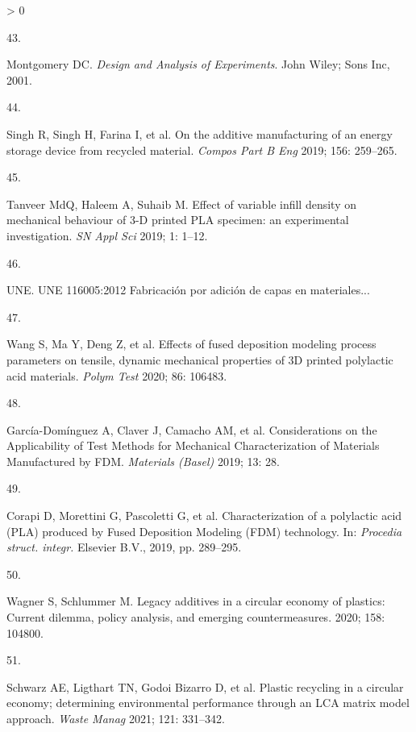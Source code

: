 \documentclass[
  12pt]{article}
\newlength{\cslhangindent}
\newlength{\csllabelwidth}
\newenvironment{CSLReferences}[2] %
 {%
  \setlength{\parindent}{0pt}
  \ifodd #1 \everypar{\setlength{\hangindent}{\cslhangindent}}\ignorespaces\fi
  \ifnum #2 > 0
  \setlength{\parskip}{#2\baselineskip}
  \fi
 }%
 {}
\newcommand{\CSLLeftMargin}[1]{\parbox[t]{\csllabelwidth}{#1}}
\newcommand{\CSLRightInline}[1]{\parbox[t]{\linewidth - \csllabelwidth}{#1}\break}
\begin{document}
\begin{CSLReferences}{0}{0}
\leavevmode\hypertarget{ref-Montgomery2001}{}%
\CSLLeftMargin{43. }
\CSLRightInline{Montgomery DC. \emph{{Design and Analysis of Experiments}}. John Wiley; Sons Inc, 2001.}

\leavevmode\hypertarget{ref-Singh2019}{}%
\CSLLeftMargin{44. }
\CSLRightInline{Singh R, Singh H, Farina I, et al. {On the additive manufacturing of an energy storage device from recycled material}. \emph{Compos Part B Eng} 2019; 156: 259--265.}

\leavevmode\hypertarget{ref-Tanveer2019}{}%
\CSLLeftMargin{45. }
\CSLRightInline{Tanveer MdQ, Haleem A, Suhaib M. {Effect of variable infill density on mechanical behaviour of 3-D printed PLA specimen: an experimental investigation}. \emph{SN Appl Sci} 2019; 1: 1--12.}

\leavevmode\hypertarget{ref-UNE}{}%
\CSLLeftMargin{46. }
\CSLRightInline{UNE. {UNE 116005:2012 Fabricaci{ó}n por adici{ó}n de capas en materiales...}}

\leavevmode\hypertarget{ref-Wang2020h}{}%
\CSLLeftMargin{47. }
\CSLRightInline{Wang S, Ma Y, Deng Z, et al. {Effects of fused deposition modeling process parameters on tensile, dynamic mechanical properties of 3D printed polylactic acid materials}. \emph{Polym Test} 2020; 86: 106483.}

\leavevmode\hypertarget{ref-Garcia-Dominguez2020}{}%
\CSLLeftMargin{48. }
\CSLRightInline{García-Domínguez A, Claver J, Camacho AM, et al. {Considerations on the Applicability of Test Methods for Mechanical Characterization of Materials Manufactured by FDM}. \emph{Materials (Basel)} 2019; 13: 28.}

\leavevmode\hypertarget{ref-Corapi2019}{}%
\CSLLeftMargin{49. }
\CSLRightInline{Corapi D, Morettini G, Pascoletti G, et al. {Characterization of a polylactic acid (PLA) produced by Fused Deposition Modeling (FDM) technology}. In: \emph{Procedia struct. integr.} Elsevier B.V., 2019, pp. 289--295.}

\leavevmode\hypertarget{ref-Wagner2020}{}%
\CSLLeftMargin{50. }
\CSLRightInline{Wagner S, Schlummer M. {Legacy additives in a circular economy of plastics: Current dilemma, policy analysis, and emerging countermeasures}. 2020; 158: 104800.}

\leavevmode\hypertarget{ref-Schwarz2021}{}%
\CSLLeftMargin{51. }
\CSLRightInline{Schwarz AE, Ligthart TN, Godoi Bizarro D, et al. {Plastic recycling in a circular economy; determining environmental performance through an LCA matrix model approach}. \emph{Waste Manag} 2021; 121: 331--342.}


\end{CSLReferences}
\end{document}
